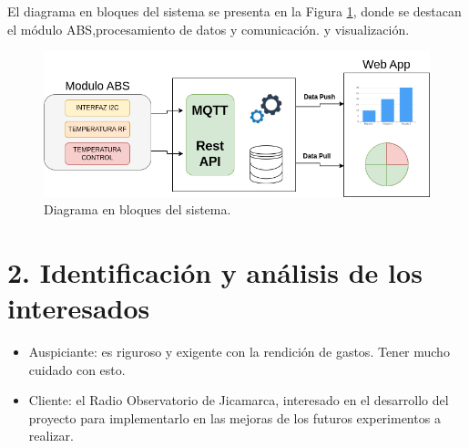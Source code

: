 \documentclass[
11pt, %
]{charter}
\begin{document}
El diagrama en bloques del sistema se presenta en la Figura \ref{fig:diagBloques}, donde se destacan el módulo ABS,procesamiento de datos y comunicación. y visualización.

\begin{figure}[htpb]
	\centering 
	\includegraphics[width=.90\textwidth]{./Figuras/diagBloques.png}
	\caption{Diagrama en bloques del sistema.}
	\label{fig:diagBloques}
\end{figure}

\vspace{25px}


\section{2. Identificación y análisis de los interesados}
\label{sec:interesados}

\begin{itemize}
	\item Auspiciante: es riguroso y exigente con la rendición de gastos. Tener mucho cuidado con esto.
	\item Cliente: el Radio Observatorio de Jicamarca, interesado en el desarrollo del proyecto para implementarlo en las mejoras de los futuros experimentos a realizar.
\end{itemize}
\end{document}
